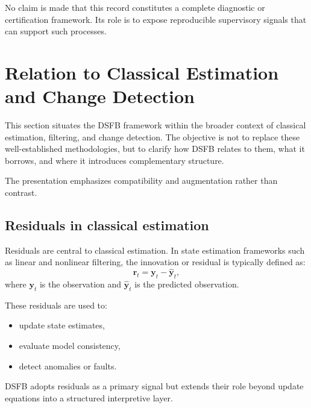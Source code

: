 \documentclass[11pt,letterpaper]{article}
\theoremstyle{gcresult}
\theoremstyle{definition}
\begin{document}
No claim is made that this record constitutes a complete diagnostic or certification framework. Its role is to expose reproducible supervisory signals that can support such processes.



\section{Relation to Classical Estimation and Change Detection}
\label{sec:classical}

This section situates the DSFB framework within the broader context of classical estimation, filtering, and change detection. The objective is not to replace these well-established methodologies, but to clarify how DSFB relates to them, what it borrows, and where it introduces complementary structure.

The presentation emphasizes compatibility and augmentation rather than contrast.


\subsection{Residuals in classical estimation}

Residuals are central to classical estimation. In state estimation frameworks such as linear and nonlinear filtering, the innovation or residual is typically defined as:
\begin{equation}
\mathbf{r}_t = \mathbf{y}_t - \hat{\mathbf{y}}_t,
\end{equation}
where $\mathbf{y}_t$ is the observation and $\hat{\mathbf{y}}_t$ is the predicted observation.

These residuals are used to:
\begin{itemize}[leftmargin=1.5em]
    \item update state estimates,
    \item evaluate model consistency,
    \item detect anomalies or faults.
\end{itemize}

DSFB adopts residuals as a primary signal but extends their role beyond update equations into a structured interpretive layer.

\end{document}
